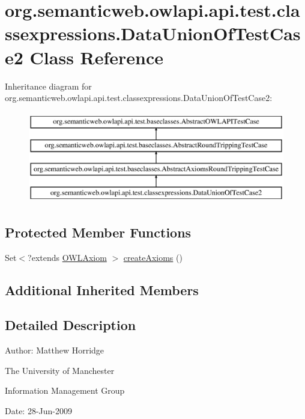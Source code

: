 \hypertarget{classorg_1_1semanticweb_1_1owlapi_1_1api_1_1test_1_1classexpressions_1_1_data_union_of_test_case2}{\section{org.\-semanticweb.\-owlapi.\-api.\-test.\-classexpressions.\-Data\-Union\-Of\-Test\-Case2 Class Reference}
\label{classorg_1_1semanticweb_1_1owlapi_1_1api_1_1test_1_1classexpressions_1_1_data_union_of_test_case2}
}
Inheritance diagram for org.\-semanticweb.\-owlapi.\-api.\-test.\-classexpressions.\-Data\-Union\-Of\-Test\-Case2\-:\begin{figure}[H]
\begin{center}
\leavevmode
\includegraphics[height=4.000000cm]{classorg_1_1semanticweb_1_1owlapi_1_1api_1_1test_1_1classexpressions_1_1_data_union_of_test_case2}
\end{center}
\end{figure}
\subsection*{Protected Member Functions}
\begin{DoxyCompactItemize}
\item 
Set$<$?extends \hyperlink{interfaceorg_1_1semanticweb_1_1owlapi_1_1model_1_1_o_w_l_axiom}{O\-W\-L\-Axiom} $>$ \hyperlink{classorg_1_1semanticweb_1_1owlapi_1_1api_1_1test_1_1classexpressions_1_1_data_union_of_test_case2_a5b8b8eca10816261c0e861e58ea985b0}{create\-Axioms} ()
\end{DoxyCompactItemize}
\subsection*{Additional Inherited Members}


\subsection{Detailed Description}
Author\-: Matthew Horridge\par
 The University of Manchester\par
 Information Management Group\par
 Date\-: 28-\/\-Jun-\/2009 

